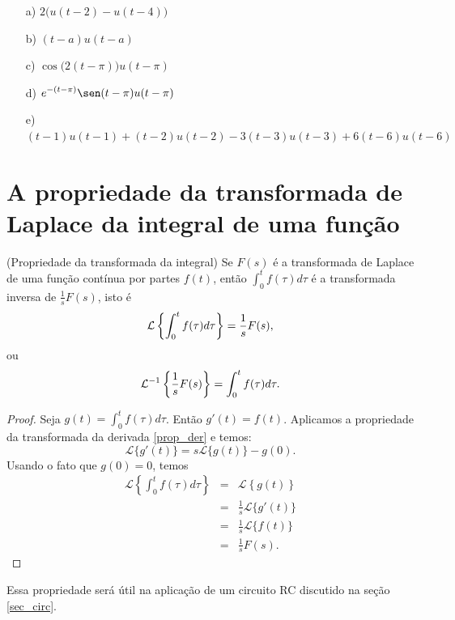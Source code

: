 \begin{resp}
\begin{itemize}
\item[a)] $\displaystyle 2 \big( u(t-2) - u(t-4) \big)$
  \item[b)] $\displaystyle (t-a)u(t-a)$
  \item[c)] $\displaystyle \cos\big(2(t-\pi)\big)u(t-\pi)$
  \item[d)] $\displaystyle e^{-(t-\pi)} \sen(t-\pi)u(t-\pi)$
  \item[e)] $\displaystyle (t-1)u(t-1) + (t-2)u(t-2) -3(t-3)u(t-3) + 6(t-6)u(t-6)$
\end{itemize}
\end{resp}

\section{A propriedade da transformada de Laplace da integral de uma função}
\begin{teo}{\label{prop_trans_int}}(Propriedade da transformada da integral) Se $F(s)$ é a transformada de Laplace de uma função contínua por partes $f(t)$, então $\int_0^tf(\tau)d\tau$ é a transformada inversa de $\frac{1}{s}F(s)$, isto é
\begin{equation}{\label{eq_trans_int}}
\mathcal{L}\left\{\int_0^tf(\tau)d\tau\right\} =\frac{1}{s}F(s),
\end{equation}
ou
\begin{equation}{\label{eq_trans_int_inv}}
\mathcal{L}^{-1} \left\{\frac{1}{s}F(s)\right\} =\int_0^tf(\tau)d\tau.
\end{equation}
\end{teo}
\begin{proof}Seja $g(t)=\int_0^tf(\tau)d\tau$. Então $g'(t)=f(t)$. Aplicamos a propriedade da transformada da derivada \ref{prop_der} e temos:
\begin{equation}
\mathcal{L}\{g'(t)\}=s\mathcal{L}\{g(t)\}-g(0).
\end{equation}
Usando o fato que $g(0)=0$, temos
\begin{eqnarray*}
\mathcal{L}\left\{\int_0^tf(\tau)d\tau\right\}&=&\mathcal{L}\left\{g(t)\right\}\\
&=&\frac{1}{s}\mathcal{L}\{g'(t)\}\\
&=&\frac{1}{s}\mathcal{L}\{f(t)\}\\
&=&\frac{1}{s}F(s).
\end{eqnarray*}
\end{proof}
Essa propriedade será útil na aplicação de um circuito RC discutido na seção \ref{sec_circ}.
